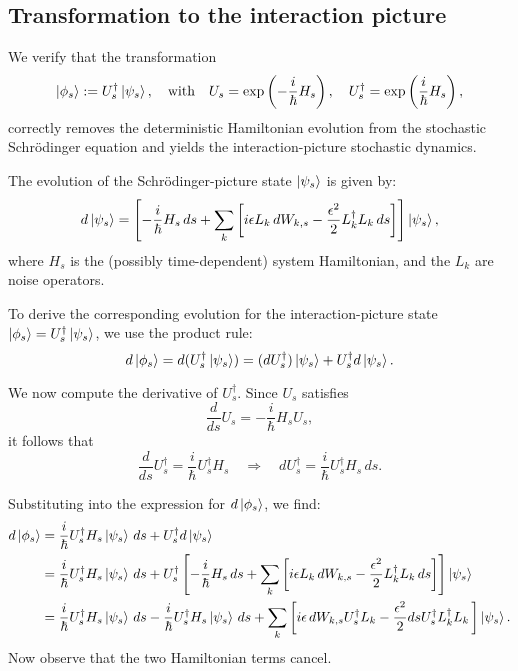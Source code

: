 \documentclass{article}
\begin{document}
\subsection{Transformation to the interaction picture}

We verify that the transformation
\[
\ket{\phi_s} := U_s^\dagger \ket{\psi_s}, \quad \text{with} \quad U_s = \exp\left(- \frac{i}{\hbar} H_s  \right), \quad U_s^\dagger = \exp\left( \frac{i}{\hbar} H_s  \right),
\]
correctly removes the deterministic Hamiltonian evolution from the stochastic Schrödinger equation and yields the interaction-picture stochastic dynamics.

\vspace{1em}
\noindent
The evolution of the Schrödinger-picture state \( \ket{\psi_s} \) is given by:
\begin{equation}
d \ket{\psi_s} = \left[ -\frac{i}{\hbar} H_s \, ds +  \sum_k \left[i \epsilon L_k \, dW_{k,s} - \frac{\epsilon^2}{2} L_k^\dagger L_k  \, ds\right] \right]\ket{\psi_s} ,
\label{eq:schrodinger_sde}
\end{equation}
where \( H_s \) is the (possibly time-dependent) system Hamiltonian, and the \( L_k \) are noise operators.

To derive the corresponding evolution for the interaction-picture state \( \ket{\phi_s} = U_s^\dagger \ket{\psi_s} \), we use the product rule:
\[
d \ket{\phi_s} = d(U_s^\dagger \ket{\psi_s}) = (dU_s^\dagger) \ket{\psi_s} + U_s^\dagger d \ket{\psi_s}.
\]

We now compute the derivative of \( U_s^\dagger \). Since \( U_s \) satisfies
\[
\frac{d}{ds} U_s =-\frac{i}{\hbar} H_s U_s,
\]
it follows that
\[
\frac{d}{ds} U_s^\dagger = \frac{i}{\hbar} U_s^\dagger H_s \quad \Rightarrow \quad dU_s^\dagger = \frac{i}{\hbar} U_s^\dagger H_s \, ds.
\]

Substituting into the expression for \( d\ket{\phi_s} \), we find:
\begin{align}
d \ket{\phi_s} 
&= \frac{i}{\hbar} U_s^\dagger H_s \ket{\psi_s} \, ds + U_s^\dagger d \ket{\psi_s} \notag \\
&= \frac{i}{\hbar} U_s^\dagger H_s \ket{\psi_s} \, ds 
+ U_s^\dagger \left[ -\frac{i}{\hbar} H_s \, ds + \sum_k \left[i \epsilon L_k \, dW_{k,s} - \frac{\epsilon^2}{2} L_k^\dagger L_k  \, ds\right] \right]\ket{\psi_s} \notag \\
&= \frac{i}{\hbar} U_s^\dagger H_s \ket{\psi_s} \, ds 
- \frac{i}{\hbar} U_s^\dagger H_s \ket{\psi_s} \, ds 
+  \sum_k \left[i \epsilon  \, dW_{k,s}U_s^\dagger L_k - \frac{\epsilon^2}{2} ds U_s^\dagger L_k^\dagger L_k  \, \right] \ket{\psi_s} .
\end{align}
Now observe that the two Hamiltonian terms cancel. 
\end{document}
